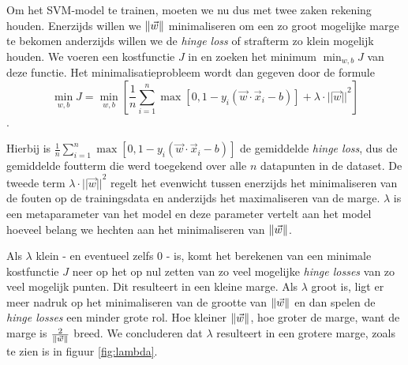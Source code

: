 \documentclass[TeamE-eindrapport]{subfiles}
\begin{document}
	Om het SVM-model te trainen, moeten we nu dus met twee zaken rekening houden. Enerzijds willen we \(\left\| \vec{w} \right\|\) minimaliseren om een zo groot mogelijke marge te bekomen anderzijds willen we de \textit{hinge loss} of strafterm zo klein mogelijk houden. We voeren een kostfunctie \(J\) in en zoeken het minimum \(\min_{w, b}J\) van deze functie. Het minimalisatieprobleem wordt dan gegeven door de formule \[\min_{w, b}J=\min_{w, b}\left[\frac{1}{n}\sum_{i=1}^n{\max{[0,1-y_i(\vec{w}\cdot\vec{x}_i-b)]}} + \lambda\cdot{||\vec{w}||}^2\right]\].
	
	Hierbij is \(\frac{1}{n}\sum_{i=1}^n{\max{[0,1-y_i(\vec{w}\cdot\vec{x}_i-b)]}}\) de gemiddelde \textit{hinge loss}, dus de gemiddelde foutterm die werd toegekend over alle \(n\) datapunten in de dataset. De tweede term \(\lambda\cdot{||\vec{w}||}^2\) regelt het evenwicht tussen enerzijds het minimaliseren van de fouten op de trainingsdata en anderzijds het maximaliseren van de marge. \(\lambda\) is een metaparameter van het model en deze parameter vertelt aan het model hoeveel belang we hechten aan het minimaliseren van \(\left\| \vec{w} \right\|\). 
	
	Als \(\lambda\) klein - en eventueel zelfs \(0\) - is, komt het berekenen van een minimale kostfunctie $J$ neer op het op nul zetten van zo veel mogelijke \textit{hinge losses} van zo veel mogelijk punten. Dit resulteert in een kleine marge. Als \(\lambda\) groot is, ligt er meer nadruk op het minimaliseren van de grootte van \(\left\| \vec{w} \right\|\) en dan spelen de \textit{hinge losses} een minder grote rol. Hoe kleiner \(\left\| \vec{w} \right\|\), hoe groter de marge, want de marge is \(\frac{2}{\left\| \vec{w} \right\|}\) breed. We concluderen dat \(\lambda\) resulteert in een grotere marge, zoals te zien is in figuur \ref{fig:lambda}.
	
\end{document}
